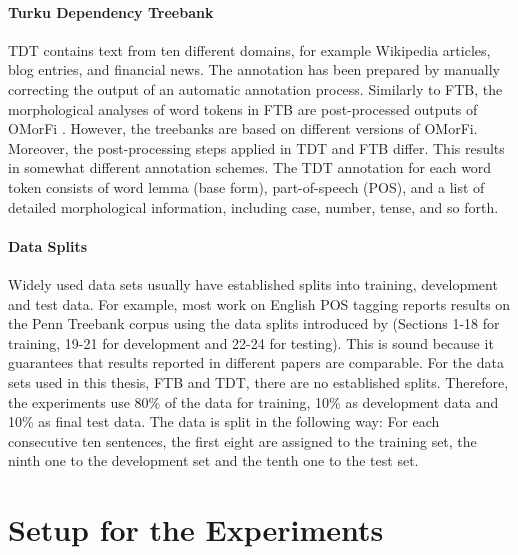 \paragraph{Turku Dependency Treebank} TDT contains text from ten different domains, for example Wikipedia articles, blog entries, and financial news. The annotation has been prepared by manually correcting the output of an automatic annotation process.
Similarly to FTB, the morphological analyses of word tokens in FTB are
post-processed outputs of OMorFi \citep{Pirinen2011}. However, the
treebanks are based on different versions of OMorFi. Moreover, the
post-processing steps applied in TDT and FTB differ. This results in
somewhat different annotation schemes.  The TDT annotation for each
word token consists of word lemma (base form), part-of-speech (POS),
and a list of detailed morphological information, including case,
number, tense, and so forth.

\paragraph{Data Splits} Widely used data sets usually have established
splits into training, development and test data. For example, most
work on English POS tagging reports results on the Penn Treebank
corpus \citep{Marcus1993} using the data splits introduced by
\cite{Collins2002} (Sections 1-18 for training, 19-21 for development
and 22-24 for testing). This is sound because it guarantees that
results reported in different papers are comparable. For the data sets
used in this thesis, FTB and TDT, there are no established
splits. Therefore, the experiments use 80\% of the data for training,
10\% as development data and 10\% as final test data. The data is
split in the following way: For each consecutive ten sentences, the
first eight are assigned to the training set, the ninth one to the
development set and the tenth one to the test set.

\section{Setup for the Experiments}


